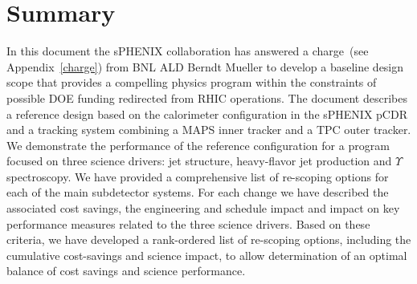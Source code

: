 \section{Summary}

In this document the sPHENIX collaboration has answered a charge~(see
Appendix~\ref{charge}) from BNL ALD Berndt Mueller to develop
a baseline design scope that provides a compelling physics program
within the constraints of possible DOE funding redirected from
RHIC operations. The document describes a reference design based
on the calorimeter configuration in the sPHENIX pCDR and a tracking system
combining a MAPS inner tracker and a TPC outer tracker. We
demonstrate the performance of the reference configuration for 
a program focused on three science drivers: jet structure,
heavy-flavor jet production and $\Upsilon$ spectroscopy.
We have provided a comprehensive list of re-scoping options for each
of the main subdetector systems. For each change we have 
described the associated
cost savings, the engineering and schedule impact and impact on
key performance measures related to the three science
drivers. Based on these criteria, we have developed a
rank-ordered list of re-scoping options, including the
cumulative cost-savings and science impact, to allow determination
of an optimal balance of cost savings and science performance.
